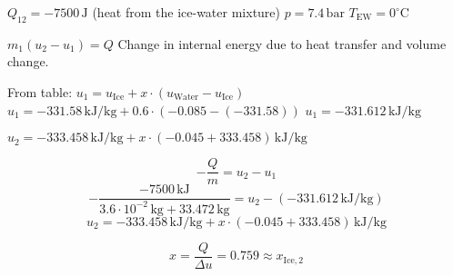 \( Q_{12} = -7500 \, \text{J} \) (heat from the ice-water mixture)  
\( p = 7.4 \, \text{bar} \)  
\( T_{\text{EW}} = 0^\circ \text{C} \)  

\( m_1 (u_2 - u_1) = Q \)  
Change in internal energy due to heat transfer and volume change.  

From table:  
\( u_1 = u_{\text{Ice}} + x \cdot (u_{\text{Water}} - u_{\text{Ice}}) \)  
\( u_1 = -331.58 \, \text{kJ/kg} + 0.6 \cdot (-0.085 - (-331.58)) \)  
\( u_1 = -331.612 \, \text{kJ/kg} \)  

\( u_2 = -333.458 \, \text{kJ/kg} + x \cdot (-0.045 + 333.458) \, \text{kJ/kg} \)  

\[
-\frac{Q}{m} = u_2 - u_1  
\]  
\[
-\frac{-7500 \, \text{kJ}}{3.6 \cdot 10^{-2} \, \text{kg} + 33.472 \, \text{kg}} = u_2 - (-331.612 \, \text{kJ/kg})  
\]  
\[
u_2 = -333.458 \, \text{kJ/kg} + x \cdot (-0.045 + 333.458) \, \text{kJ/kg}  
\]  

\[
x = \frac{Q}{\Delta u} = 0.759 \approx x_{\text{Ice},2}  
\]
